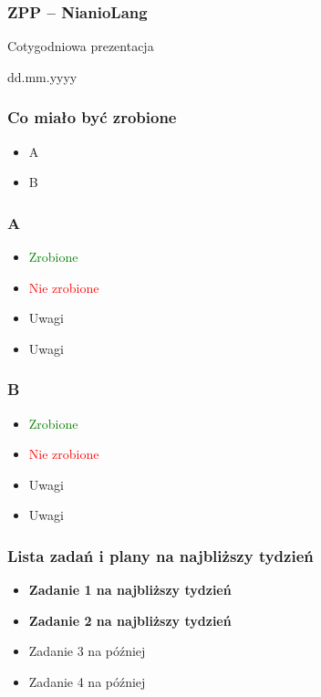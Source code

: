 \documentclass{beamer}
\begin{document}
	\begin{frame}
		\frametitle{ZPP -- NianioLang}
		Cotygodniowa prezentacja
		
		dd.mm.yyyy
	\end{frame}
	
	\begin{frame}
		\frametitle{Co miało być zrobione}
		\begin{itemize}
		 \item A
		 \item B
		\end{itemize}
	\end{frame}
	
	\begin{frame}
		\frametitle{A}
		\begin{itemize}
			\item\textcolor{green}{Zrobione}
			\item\textcolor{red}{Nie zrobione}
			\item Uwagi
			\item Uwagi
		\end{itemize}
	\end{frame}
	
	\begin{frame}
		\frametitle{B}
		\begin{itemize}
			\item\textcolor{green}{Zrobione}
			\item\textcolor{red}{Nie zrobione}
			\item Uwagi
			\item Uwagi
		\end{itemize}
	\end{frame}
	
	\begin{frame}
		\frametitle{Lista zadań i plany na najbliższy tydzień}
		\begin{itemize}
			\item{\textbf{Zadanie 1 na najbliższy tydzień}}
			\item{\textbf{Zadanie 2 na najbliższy tydzień}}
			\item{Zadanie 3 na później}
			\item{Zadanie 4 na później}
		\end{itemize}
	\end{frame}
\end{document}
